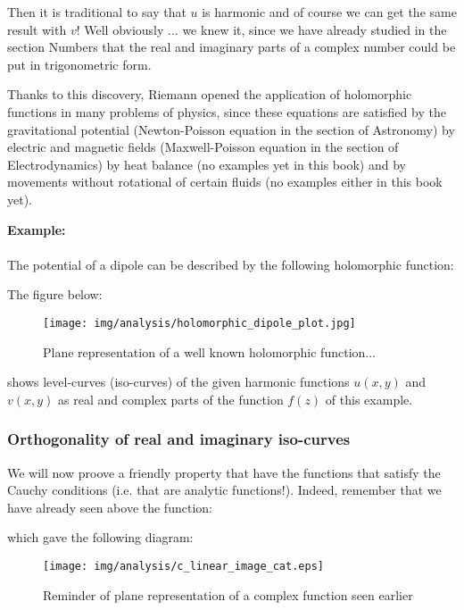 	Then it is traditional to say that $u$ is harmonic and of course we can get the same result with $v$! Well obviously ... we knew it, since we have already studied in the section Numbers that the real and imaginary parts of a complex number could be put in trigonometric form.

	Thanks to this discovery, Riemann opened the application of holomorphic functions in many problems of physics, since these equations are satisfied by the gravitational potential (Newton-Poisson equation in the section of Astronomy) by electric and magnetic fields (Maxwell-Poisson equation in the section of Electrodynamics) by heat balance (no examples yet in this book) and by movements without rotational of certain fluids (no examples either in this book yet).

	
	\begin{tcolorbox}[colframe=black,colback=white,sharp corners]
	\textbf{{\Large {}}Example:}\\\\
	The potential of a dipole can be described by the following holomorphic function:
	
	The figure below:
	\begin{figure}[H]
		\centering
		\texttt{[image: img/analysis/holomorphic\_dipole\_plot.jpg]}
		\caption{Plane representation of a well known holomorphic function...}
	\end{figure}
	shows level-curves (iso-curves) of the given harmonic functions $u (x, y)$ and $v (x, y)$ as real and complex parts of the function $f (z)$ of this example.
	\end{tcolorbox}
	
	
	\pagebreak
	\subsubsection{Orthogonality of real and imaginary iso-curves}
	We will now proove a friendly property that have the functions that satisfy the Cauchy conditions (i.e. that are analytic functions!). Indeed, remember that we have already seen above the function:
	
	which gave the following diagram:
	\begin{figure}[H]
		\begin{center}
			\texttt{[image: img/analysis/c\_linear\_image\_cat.eps]}
		\end{center}	
		\caption{Reminder of plane representation of a complex function seen earlier}
	\end{figure}
	
